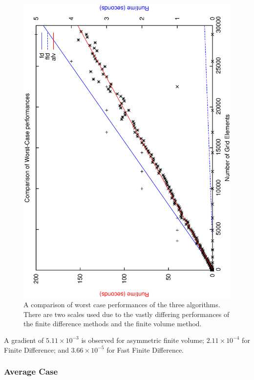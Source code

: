 \documentclass[aps,twocolumn,pre,nofootinbib,10pt]{revtex4-1}
\begin{document}
\begin{figure}
    \caption{A comparison of worst case performances of the three algorithms. There are two scales used due to the vastly differing performances of the finite difference methods and the finite volume method.}
    \label{fig:wcalgcomp}
    \begin{center}
        \includegraphics*[angle=-90,width = \columnwidth ]{comparison_wc.ps}
    \end{center}
\end{figure}

A gradient of $5.11 \times 10^{-3}$ is observed for asymmetric finite volume; $2.11 \times 10^{-4}$ for Finite Difference; and $3.66 \times 10^{-5}$ for Fast Finite Difference.

\subsubsection{Average Case}
\end{document}

